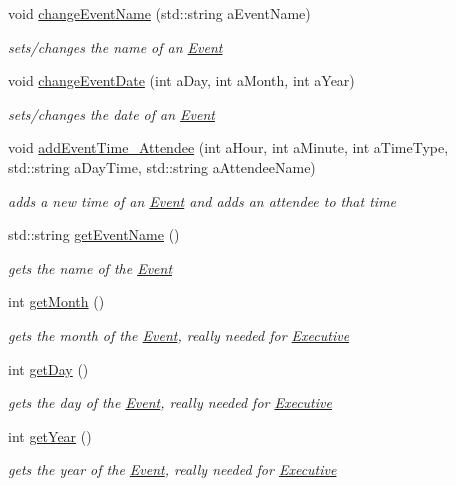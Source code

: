 \begin{DoxyCompactItemize}
void \hyperlink{classEvent_a6131dc74cbd61a6426177ff9ee8b3aec}{change\+Event\+Name} (std\+::string a\+Event\+Name)
\begin{DoxyCompactList}\small\item\em sets/changes the name of an \hyperlink{classEvent}{Event} \end{DoxyCompactList}\item 
void \hyperlink{classEvent_ac94285510b4e5a4fe7a89f6df20c34d8}{change\+Event\+Date} (int a\+Day, int a\+Month, int a\+Year)
\begin{DoxyCompactList}\small\item\em sets/changes the date of an \hyperlink{classEvent}{Event} \end{DoxyCompactList}\item 
void \hyperlink{classEvent_a78d96d2a4051aa6892170fce36a9333f}{add\+Event\+Time\+\_\+\+Attendee} (int a\+Hour, int a\+Minute, int a\+Time\+Type, std\+::string a\+Day\+Time, std\+::string a\+Attendee\+Name)
\begin{DoxyCompactList}\small\item\em adds a new time of an \hyperlink{classEvent}{Event} and adds an attendee to that time \end{DoxyCompactList}\item 
std\+::string \hyperlink{classEvent_adea2d0aae8fb9d4efd7ea4bebc8ceb24}{get\+Event\+Name} ()
\begin{DoxyCompactList}\small\item\em gets the name of the \hyperlink{classEvent}{Event} \end{DoxyCompactList}\item 
int \hyperlink{classEvent_aca9222d91f31df84d7abb12504d9df0e}{get\+Month} ()
\begin{DoxyCompactList}\small\item\em gets the month of the \hyperlink{classEvent}{Event}, really needed for \hyperlink{classExecutive}{Executive} \end{DoxyCompactList}\item 
int \hyperlink{classEvent_a6f103ed44e572e38a7b5617d65df8c49}{get\+Day} ()
\begin{DoxyCompactList}\small\item\em gets the day of the \hyperlink{classEvent}{Event}, really needed for \hyperlink{classExecutive}{Executive} \end{DoxyCompactList}\item 
int \hyperlink{classEvent_a513ec8ed5e392402b68bfa1e78bce4a4}{get\+Year} ()
\begin{DoxyCompactList}\small\item\em gets the year of the \hyperlink{classEvent}{Event}, really needed for \hyperlink{classExecutive}{Executive} \end{DoxyCompactList}\item 

\end{DoxyCompactItemize}
